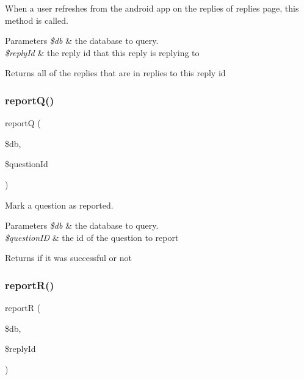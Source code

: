 When a user refreshes from the android app on the replies of replies page, this method is called. 


\begin{DoxyParams}{Parameters}
{\em \$db} & the database to query. \\
\hline
{\em \$reply\+Id} & the reply id that this reply is replying to \\
\hline
\end{DoxyParams}
\begin{DoxyReturn}{Returns}
all of the replies that are in replies to this reply id 
\end{DoxyReturn}
\mbox{\label{androidApi_8php_ac56862a233d867f66572c317e72866b7}} 
\subsubsection{\texorpdfstring{report\+Q()}{reportQ()}}
{\footnotesize\ttfamily reportQ (\begin{DoxyParamCaption}\item[{}]{\$db,  }\item[{}]{\$question\+Id }\end{DoxyParamCaption})}



Mark a question as reported. 


\begin{DoxyParams}{Parameters}
{\em \$db} & the database to query. \\
\hline
{\em \$question\+ID} & the id of the question to report \\
\hline
\end{DoxyParams}
\begin{DoxyReturn}{Returns}
if it was successful or not 
\end{DoxyReturn}
\mbox{\label{androidApi_8php_aed1a7d6c08dece8c10b1c3c726e7c50b}} 
\subsubsection{\texorpdfstring{report\+R()}{reportR()}}
{\footnotesize\ttfamily reportR (\begin{DoxyParamCaption}\item[{}]{\$db,  }\item[{}]{\$reply\+Id }\end{DoxyParamCaption})}



